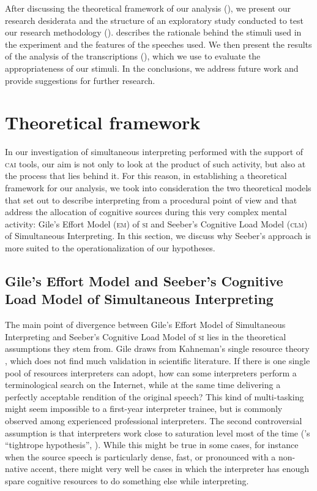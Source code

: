 \documentclass[output=paper]{langsci/langscibook}
\begin{document}
After discussing the theoretical framework of our analysis (), we present our research desiderata and the structure of an exploratory study conducted to test our research methodology ().  describes the rationale behind the stimuli used in the experiment and the features of the speeches used. We then present the results of the analysis of the transcriptions (), which we use to evaluate the appropriateness of our stimuli. In the conclusions, we address future work and provide suggestions for further research.

\section{Theoretical framework}\label{sec:prandi:2}
In our investigation of simultaneous interpreting performed with the support of \textsc{cai} tools, our aim is not only to look at the product of such activity, but also at the process that lies behind it. For this reason, in establishing a theoretical framework for our analysis, we took into consideration the two theoretical models that set out to describe interpreting from a procedural point of view and that address the allocation of cognitive sources during this very complex mental activity: Gile’s Effort Model (\textsc{em}) of \textsc{si} and Seeber’s Cognitive Load Model (\textsc{clm}) of Simultaneous Interpreting. In this section, we discuss why Seeber’s approach is more suited to the operationalization of our hypotheses.

\subsection{Gile’s Effort Model and Seeber’s Cognitive Load Model of Simultaneous Interpreting}\label{sec:prandi:2.1}
The main point of divergence between Gile’s Effort Model of Simultaneous Interpreting \citep{Gile1988, Gile1997, Gile1999} and Seeber’s Cognitive Load Model of \textsc{si} lies in the theoretical assumptions they stem from. Gile draws from Kahneman’s single resource theory \citep{Kahneman1973}, which does not find much validation in scientific literature. If there is one single pool of resources interpreters can adopt, how can some interpreters perform a terminological search on the Internet, while at the same time delivering a perfectly acceptable rendition of the original speech? This kind of multi-tasking might seem impossible to a first-year interpreter trainee, but is commonly observed among experienced professional interpreters. The second controversial assumption is that interpreters work close to saturation level most of the time (\citeauthor{Gile1999}’s ``tightrope hypothesis'', \citeyear{Gile1999}). While this might be true in some cases, for instance when the source speech is particularly dense, fast, or pronounced with a non-native accent, there might very well be cases in which the interpreter has enough spare cognitive resources to do something else while interpreting. 
\end{document}
